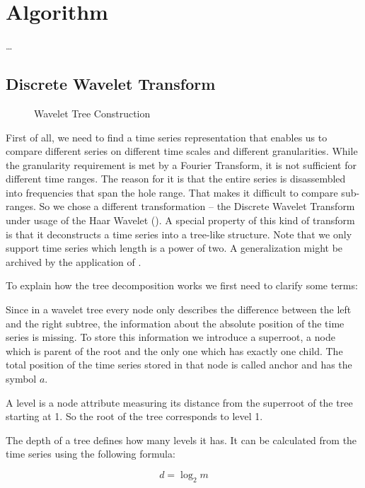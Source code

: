 \chapter{Algorithm}
\label{ch:algorithm}

\dots



\section{Discrete Wavelet Transform}
\label{sec:algorithm:wavelet}

\begin{figure}
    \centering
    
    \caption{Wavelet Tree Construction}
    \label{fig:wavelet_tree_example}
\end{figure}

First of all, we need to find a time series representation that enables us to compare different series on different time scales and different granularities. While the granularity requirement is met by a Fourier Transform, it is not sufficient for different time ranges. The reason for it is that the entire series is disassembled into frequencies that span the hole range. That makes it difficult to compare sub-ranges. So we chose a different transformation -- the Discrete Wavelet Transform under usage of the Haar Wavelet (\cite{Haar}). A special property of this kind of transform is that it deconstructs a time series into a tree-like structure. Note that we only support time series which length is a power of two. A generalization might be archived by the application of \cite{haar_tree_notwo}.

To explain how the tree decomposition works we first need to clarify some terms:

\begin{definition}[Superroot]
    Since in a wavelet tree every node only describes the difference between the left and the right subtree, the information about the absolute position of the time series is missing. To store this information we introduce a superroot, a node which is parent of the root and the only one which has exactly one child. The total position of the time series stored in that node is called anchor and has the symbol $a$.
\end{definition}

\begin{definition}
    A level is a node attribute measuring its distance from the superroot of the tree starting at \num{1}. So the root of the tree corresponds to level \num{1}.

    The depth of a tree defines how many levels it has. It can be calculated from the time series using the following formula:

    \begin{equation}\label{eq:d}
        d = \log_2 m
    \end{equation}
\end{definition}

